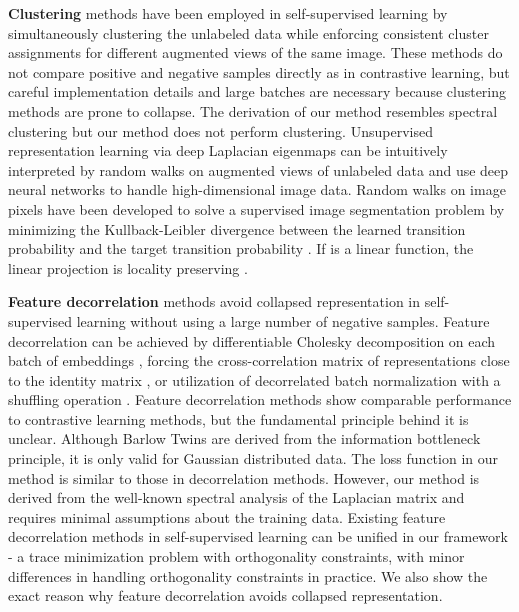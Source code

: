 \documentclass{article}
\begin{document}
\textbf{Clustering} methods have been employed in self-supervised learning \citep{caron:etal:2018deep,asano:etal:2019sela,caron:etal:2020swav} by simultaneously clustering the unlabeled data while enforcing consistent cluster assignments for different augmented views of the same image. These methods do not compare positive and negative samples directly as in contrastive learning, but careful implementation details and large batches are necessary because clustering methods are prone to collapse. The derivation of our method resembles spectral clustering but our method does not perform clustering. Unsupervised representation learning via deep Laplacian eigenmaps can be intuitively interpreted by random walks on augmented views of unlabeled data and use deep neural networks to handle high-dimensional image data. Random walks on image pixels have been developed to solve a supervised image segmentation problem by minimizing the Kullback-Leibler divergence between the learned transition probability and the target transition probability \citep{meila:shi:2000learning}. If  is a linear function, the linear projection is locality preserving \citep{He:Niyogi:2004locality}.

\textbf{Feature decorrelation} methods avoid collapsed representation in self-supervised learning without using a large number of negative samples. Feature decorrelation can be achieved by differentiable Cholesky decomposition on each batch of embeddings \citep{ermolov:etal:2021whitening},  forcing the cross-correlation matrix of representations close to the identity matrix \citep{Zbontar:etal:2021barlow}, or utilization of decorrelated batch normalization with a shuffling operation \citep{hua:etal:2021feature}. Feature decorrelation methods show comparable performance to contrastive learning methods, but the fundamental principle behind it is unclear. Although Barlow Twins \citep{Zbontar:etal:2021barlow} are derived from the information bottleneck principle, it is only valid for Gaussian distributed data. The loss function in our method is similar to those in decorrelation methods. However, our method is derived from the well-known spectral analysis of the Laplacian matrix and requires minimal assumptions about the training data. Existing feature decorrelation methods in self-supervised learning can be unified in our framework - a trace minimization problem with orthogonality constraints, with minor differences in handling orthogonality constraints in practice. We also show the exact reason why feature decorrelation avoids collapsed representation.
\end{document}

